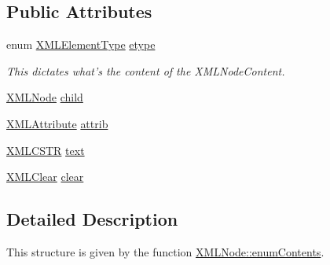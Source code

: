 \subsection*{Public Attributes}
\begin{DoxyCompactItemize}
\item 
enum \hyperlink{xmlParser_8h_a100a496e2b573b37eb4e75f00a316851}{X\-M\-L\-Element\-Type} \hyperlink{structXMLNodeContents_a3cc71f0b9fc7b75133de379f1e5d7a2b}{etype}
\begin{DoxyCompactList}\small\item\em This dictates what's the content of the X\-M\-L\-Node\-Content. \end{DoxyCompactList}\item 
\hyperlink{structXMLNode}{X\-M\-L\-Node} \hyperlink{structXMLNodeContents_a07bfee26b5b5c9e15adcb172f3b7f846}{child}
\item 
\hyperlink{structXMLAttribute}{X\-M\-L\-Attribute} \hyperlink{structXMLNodeContents_a0fd3093b1eac5edcb67bec9cf40cdaac}{attrib}
\item 
\hyperlink{xmlParser_8h_acdb0d6fd8dd596384b438d86cfb2b182}{X\-M\-L\-C\-S\-T\-R} \hyperlink{structXMLNodeContents_a9e3eda44aa3b88d61cbfbe8d5b055c51}{text}
\item 
\hyperlink{structXMLClear}{X\-M\-L\-Clear} \hyperlink{structXMLNodeContents_a08ef8b489dd008060a1ff28269c6730e}{clear}
\end{DoxyCompactItemize}


\subsection{Detailed Description}
This structure is given by the function \hyperlink{group__navigate_gaf56414ef38a13892afc4f22177a7760a}{X\-M\-L\-Node\-::enum\-Contents}. 

